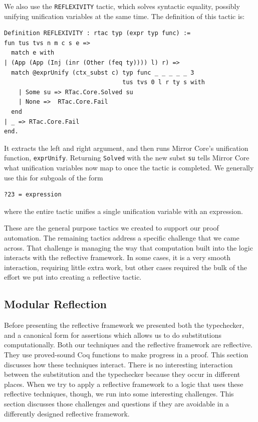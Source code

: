 \documentclass{puthesis}
\begin{document}
We also use the \lstinline|REFLEXIVITY| tactic, which solves syntactic
equality, possibly unifying unification variables at the same
time. The definition of this tactic is:

\begin{lstlisting}
Definition REFLEXIVITY : rtac typ (expr typ func) :=
fun tus tvs n m c s e => 
  match e with 
| (App (App (Inj (inr (Other (feq ty)))) l) r) =>
  match @exprUnify (ctx_subst c) typ func _ _ _ _ _ 3
                                 tus tvs 0 l r ty s with
    | Some su => RTac.Core.Solved su 
    | None =>  RTac.Core.Fail
  end
| _ => RTac.Core.Fail
end.
\end{lstlisting}

It extracts the left and right argument, and then runs Mirror Core's
unification function, \lstinline|exprUnify|. Returning
\lstinline|Solved| with the new subst \lstinline|su| tells Mirror Core
what unification variables now map to once the tactic is completed.
We generally use this for subgoals of the form 

\begin{lstlisting}
?23 = expression
\end{lstlisting}

where the entire tactic unifies a single unification variable with an expression.

These are the general purpose tactics we created to support our proof
automation. The remaining tactics address a specific challenge that we
came across. That challenge is managing the way that computation built
into the logic interacts with the reflective framework. In some cases,
it is a very smooth interaction, requiring little extra work, but
other cases required the bulk of the effort we put into creating a
reflective tactic.

\subsection{Modular Reflection}

Before presenting the reflective framework we presented both the
typechecker, and a canonical form for assertions which allows us to do
substitutions computationally.  Both our techniques and the reflective
framework are reflective.  They use proved-sound Coq functions to make
progress in a proof. This section discusses how these techniques
interact. There is no interesting interaction between the substitution
and the typechecker because they occur in different places. When we
try to apply a reflective framework to a logic that uses these
reflective techniques, though, we run into some interesting
challenges. This section discusses those challenges and questions if
they are avoidable in a differently designed reflective framework.
\end{document}
